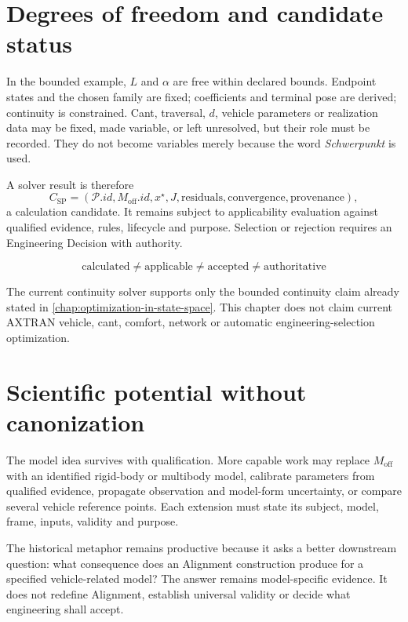 \section{Degrees of freedom and candidate status}

In the bounded example, \(L\) and \(\alpha\) are free within declared bounds.
Endpoint states and the chosen family are fixed; coefficients and terminal
pose are derived; continuity is constrained. Cant, traversal, \(d\), vehicle
parameters or realization data may be fixed, made variable, or left
unresolved, but their role must be recorded. They do not become variables
merely because the word \emph{Schwerpunkt} is used.

A solver result is therefore
\[
C_{\mathrm{SP}}=
(\mathcal P.id,M_{\mathrm{off}}.id,x^\star,J,
\text{residuals},\text{convergence},\text{provenance}),
\]
a calculation candidate. It remains subject to applicability evaluation
against qualified evidence, rules, lifecycle and purpose. Selection or
rejection requires an Engineering Decision with authority.

\[
\boxed{\text{calculated}
\neq\text{applicable}
\neq\text{accepted}
\neq\text{authoritative}}
\]

The current continuity solver supports only the bounded continuity claim
already stated in \cref{chap:optimization-in-state-space}. This chapter does
not claim current AXTRAN vehicle, cant, comfort, network or automatic
engineering-selection optimization.

\section{Scientific potential without canonization}

The model idea survives with qualification. More capable work may replace
\(M_{\mathrm{off}}\) with an identified rigid-body or multibody model, calibrate
parameters from qualified evidence, propagate observation and model-form
uncertainty, or compare several vehicle reference points. Each extension must
state its subject, model, frame, inputs, validity and purpose.

The historical metaphor remains productive because it asks a better downstream
question: what consequence does an Alignment construction produce for a
specified vehicle-related model? The answer remains model-specific evidence.
It does not redefine Alignment, establish universal validity or decide what
engineering shall accept.
